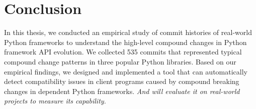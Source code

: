 \chapter{Conclusion}
\label{chap:conclusion}

In this thesis, we conducted an empirical study of commit histories of real-world Python frameworks to understand the high-level compound changes in Python framework API evolution. We collected 535 commits that represented typical compound change patterns in three popular Python libraries. Based on our empirical findings, we designed and implemented a tool that can automatically detect compatibility issues in client programs caused by compound breaking changes in dependent Python frameworks. \textit{And will evaluate it on real-world projects to measure its capability.}
